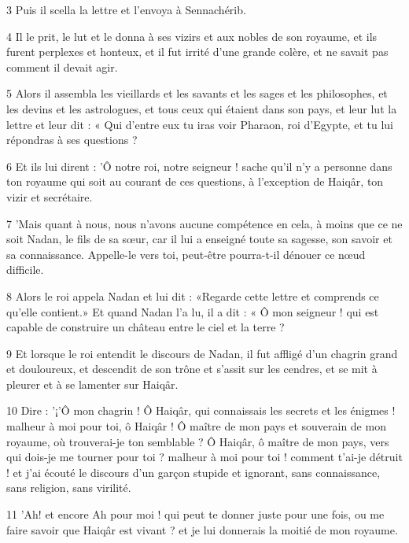 \par 3 Puis il scella la lettre et l'envoya à Sennachérib.

\par 4 Il le prit, le lut et le donna à ses vizirs et aux nobles de son royaume, et ils furent perplexes et honteux, et il fut irrité d'une grande colère, et ne savait pas comment il devait agir.

\par 5 Alors il assembla les vieillards et les savants et les sages et les philosophes, et les devins et les astrologues, et tous ceux qui étaient dans son pays, et leur lut la lettre et leur dit : « Qui d'entre eux tu iras voir Pharaon, roi d'Egypte, et tu lui répondras à ses questions ?

\par 6 Et ils lui dirent : 'Ô notre roi, notre seigneur ! sache qu'il n'y a personne dans ton royaume qui soit au courant de ces questions, à l'exception de Haiqâr, ton vizir et secrétaire.

\par 7 'Mais quant à nous, nous n'avons aucune compétence en cela, à moins que ce ne soit Nadan, le fils de sa sœur, car il lui a enseigné toute sa sagesse, son savoir et sa connaissance. Appelle-le vers toi, peut-être pourra-t-il dénouer ce nœud difficile.

\par 8 Alors le roi appela Nadan et lui dit : «Regarde cette lettre et comprends ce qu'elle contient.» Et quand Nadan l'a lu, il a dit : « Ô mon seigneur ! qui est capable de construire un château entre le ciel et la terre ?

\par 9 Et lorsque le roi entendit le discours de Nadan, il fut affligé d'un chagrin grand et douloureux, et descendit de son trône et s'assit sur les cendres, et se mit à pleurer et à se lamenter sur Haiqâr.

\par 10 Dire : '¡'Ô mon chagrin ! Ô Haiqâr, qui connaissais les secrets et les énigmes ! malheur à moi pour toi, ô Haiqâr ! Ô maître de mon pays et souverain de mon royaume, où trouverai-je ton semblable ? Ô Haiqâr, ô maître de mon pays, vers qui dois-je me tourner pour toi ? malheur à moi pour toi ! comment t'ai-je détruit ! et j'ai écouté le discours d'un garçon stupide et ignorant, sans connaissance, sans religion, sans virilité.

\par 11 'Ah! et encore Ah pour moi ! qui peut te donner juste pour une fois, ou me faire savoir que Haiqâr est vivant ? et je lui donnerais la moitié de mon royaume.

